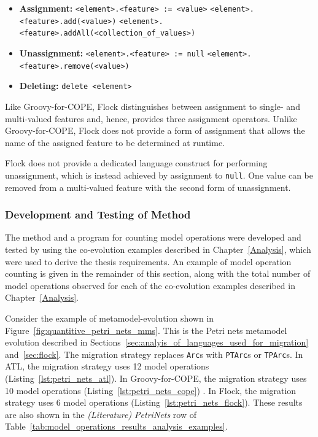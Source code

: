\begin{itemize}
	\item \textbf{Assignment:}
	\subitem \texttt{<element>.<feature> := <value>} 
	\subitem \texttt{<element>.<feature>.add(<value>)}
	\subitem \texttt{<element>.<feature>.addAll(<collection\_of\_values>)}
	
	\item \textbf{Unassignment:}
	\subitem \texttt{<element>.<feature> := null}
	\subitem \texttt{<element>.<feature>.remove(<value>)}
	
	\item \textbf{Deleting:}
	\subitem \texttt{delete <element>}
\end{itemize}

Like Groovy-for-COPE, Flock distinguishes between assignment to single- and multi-valued features and, hence, provides three assignment operators. Unlike Groovy-for-COPE, Flock does not provide a form of assignment that allows the name of the assigned feature to be determined at runtime.

Flock does not provide a dedicated language construct for performing unassignment, which is instead achieved by assignment to \texttt{null}. One value can be removed from a multi-valued feature with the second form of unassignment.


\subsubsection{Development and Testing of Method}
\label{subsubsec:quantitive_method_development}
The method and a program for counting model operations were developed and tested by using the co-evolution examples described in Chapter~\ref{Analysis}, which were used to derive the thesis requirements. An example of model operation counting is given in the remainder of this section, along with the total number of model operations observed for each of the co-evolution examples described in Chapter~\ref{Analysis}.

Consider the example of metamodel-evolution shown in Figure~\ref{fig:quantitive_petri_nets_mms}. This is the Petri nets metamodel evolution described in Sections~\ref{sec:analyis_of_languages_used_for_migration} and~\ref{sec:flock}. The migration strategy replaces \texttt{Arc}s with \texttt{PTArc}s or \texttt{TPArc}s. In ATL, the migration strategy uses 12 model operations (Listing~\ref{lst:petri_nets_atl}). In Groovy-for-COPE, the migration strategy uses 10 model operations (Listing~\ref{lst:petri_nets_cope}) . In Flock, the migration strategy uses 6 model operations (Listing~\ref{lst:petri_nets_flock}). These results are also shown in the \emph{(Literature) PetriNets} row of Table~\ref{tab:model_operations_results_analysis_examples}.


